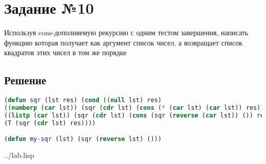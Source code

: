 \section*{Задание №10}
Используя cons-дополняемую рекурсию с одним тестом завершения,
написать функцию которая получает как аргумент список чисел, а возвращает список
квадратов этих чисел в том же порядке
\subsection*{Решение}
\begin{lstlisting}[label=5,caption=Решение задания №5, language=lisp]
(defun sqr (lst res) (cond ((null lst) res)
((numberp (car lst)) (sqr (cdr lst) (cons (* (car lst) (car lst)) res)))
((listp (car lst)) (sqr (cdr lst) (cons (sqr (reverse (car lst)) ()) res)))
(T (sqr (cdr lst) res))))

(defun my-sqr (lst) (sqr (reverse lst) ()))

\end{lstlisting}
\begin{lstinputlisting}[label=third,caption=Решение задания №9, language=lisp, firstline=1, lastline=1]{../lab.lisp}
\end{lstinputlisting}